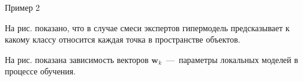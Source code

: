 \documentclass[9pt,pdf,hyperref={unicode}]{beamer}
\begin{document}
\begin{frame}{Пример 2}
\justifying
\begin{figure}
\end{figure}
На рис. показано, что в случае смеси экспертов гипермодель предсказывает к какому классу относится каждая точка в пространстве объектов.

На рис. показана зависимость векторов $\mathbf{w}_{k}$~---~параметры локальных моделей в процессе обучения.

\end{frame}
\end{document}
